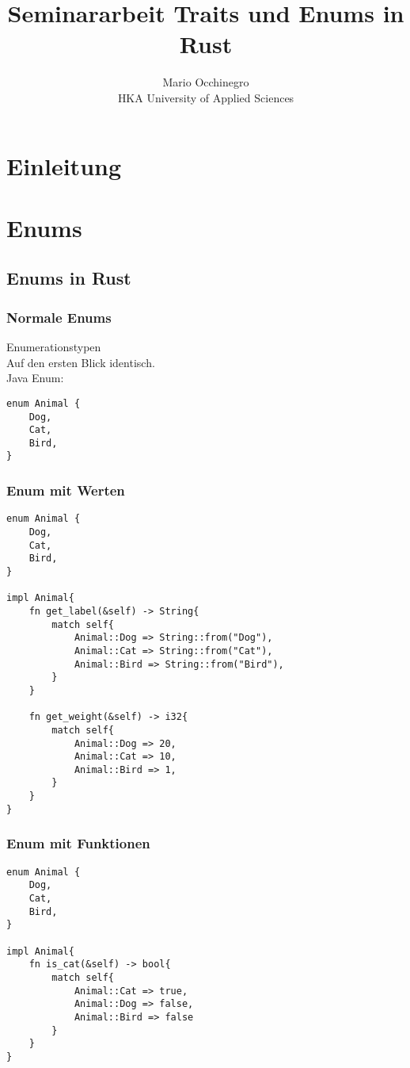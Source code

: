 \documentclass[a4paper, 1ppt]{article}
\title{Seminararbeit Traits und Enums in Rust}
\date{}
\author{Mario Occhinegro\\HKA University of Applied Sciences}
\begin{document}
\maketitle
\newpage
\clearpage
\tableofcontents
\setcounter{page}{1}
\newpage
{}
\maketitle
\begin{abstract}
\end{abstract}
\section{Einleitung}
\section{Enums}
\subsection{Enums in Rust}
\subsubsection{Normale Enums}
Enumerationstypen \\
Auf den ersten Blick identisch. \\
Java Enum:
\begin{verbatim}
enum Animal {
    Dog,
    Cat,
    Bird,
}
\end{verbatim}
\subsubsection{Enum mit Werten}
\begin{verbatim}
enum Animal {
    Dog,
    Cat,
    Bird,
}

impl Animal{
    fn get_label(&self) -> String{
        match self{
            Animal::Dog => String::from("Dog"),
            Animal::Cat => String::from("Cat"),
            Animal::Bird => String::from("Bird"),
        }
    }

    fn get_weight(&self) -> i32{
        match self{
            Animal::Dog => 20,
            Animal::Cat => 10,
            Animal::Bird => 1,
        }
    }
}

\end{verbatim}
\subsubsection{Enum mit Funktionen}
\begin{verbatim}
enum Animal {
    Dog,
    Cat,
    Bird,
}

impl Animal{
    fn is_cat(&self) -> bool{
        match self{
            Animal::Cat => true,
            Animal::Dog => false,
            Animal::Bird => false
        }
    }
}
\end{verbatim}
\end{document}
